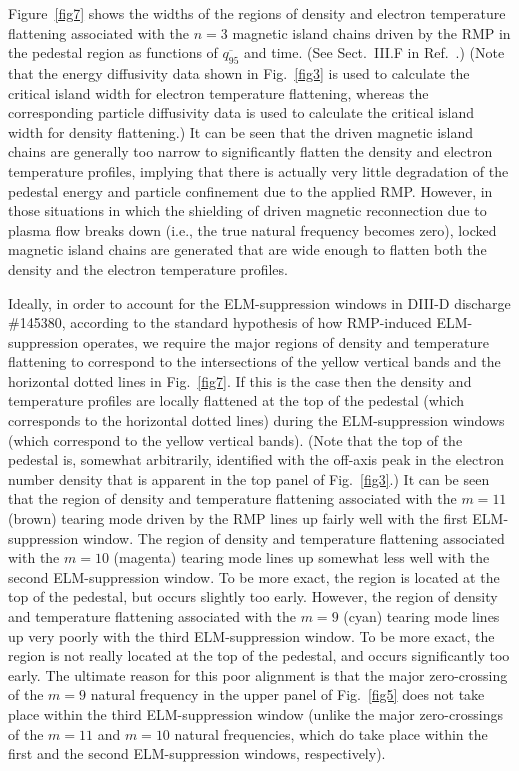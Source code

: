 \documentclass[12pt,prb,aps]{revtex4-1}
\begin{document}
Figure~\ref{fig7} shows the widths of the regions of density and electron temperature flattening associated with the $n=3$ magnetic
island chains driven by the RMP in the pedestal region as functions of $\overline{q_{95}}$ and time. (See Sect.~III.F in Ref.~.) (Note that the energy diffusivity data shown in Fig.~\ref{fig3}  is used to calculate the
critical island width for electron temperature flattening, whereas the corresponding particle diffusivity data is used to calculate
the critical island width for density flattening.\cite{flat}) It can be seen that the driven magnetic island chains are generally too narrow
to significantly flatten the density and electron temperature profiles,  implying that there is actually very little degradation of the pedestal energy and particle confinement
due to the applied RMP. 
However, in those situations in which the shielding of driven
magnetic reconnection due to plasma flow breaks down (i.e., the true natural frequency becomes zero), locked magnetic island chains are generated that are
 wide enough to flatten both the density and the electron temperature profiles. 
 
 Ideally, in order to account for the
ELM-suppression windows in DIII-D discharge \#145380, according to the standard
hypothesis of how RMP-induced ELM-suppression operates, we require the major regions of density and temperature
flattening to correspond to the intersections of the yellow vertical bands and the horizontal dotted lines in Fig.~\ref{fig7}. If this is the case then
the density and temperature profiles are locally flattened at the top of the pedestal (which corresponds to
the horizontal dotted lines) during the ELM-suppression windows (which correspond to the yellow vertical bands). (Note that the top of the pedestal
is, somewhat arbitrarily, identified with the off-axis peak in the electron number density that is apparent in the top panel of Fig.~\ref{fig3}.) It can be seen
that the region of density and temperature flattening associated with the $m=11$ (brown) tearing mode driven by the RMP lines up fairly well with the
first ELM-suppression window. The region of density and temperature flattening associated with the $m=10$ (magenta) tearing mode 
lines up somewhat less well with the second ELM-suppression window. To be more exact, the region is located at the top of the pedestal,
but occurs slightly too early. However, the 
region of density and temperature flattening associated with the $m=9$ (cyan) tearing mode 
lines up very poorly with the third ELM-suppression window. To be more exact, the region is not really located at the top of the pedestal, and occurs
significantly too early. The ultimate reason for this poor alignment is that the major zero-crossing of the $m=9$ natural
frequency in the upper panel of Fig.~\ref{fig5} does not take place within the third ELM-suppression window (unlike the
major zero-crossings of the $m=11$ and $m=10$ natural frequencies, which do take place within the first and the second
ELM-suppression windows, respectively). 
\end{document}
